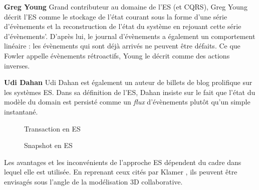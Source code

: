 \textbf{Greg Young} Grand contributeur au domaine de l'\gls{ES} (et \gls{CQRS}), Greg 
Young décrit l'\gls{ES} comme \og le stockage de l'état courant sous la forme 
d'une série d'évènements et la reconstruction de l'état du système en rejouant 
cette série d'évènements'\fg{}. D'après lui, le journal d'évènements a également 
un comportement linéaire : les évènements qui sont déjà arrivés ne peuvent 
être défaits. Ce que Fowler appelle évènements rétroactifs, Young le décrit 
comme des actions inverses.

\textbf{Udi Dahan} Udi Dahan est également un auteur de billets de blog 
prolifique sur les systèmes \gls{ES}. Dans sa définition de l'\gls{ES}, Dahan 
insiste sur le fait que \og l'état du modèle du domain est persisté comme un 
\textit{flux} d'évènements plutôt qu'un simple instantané\fg{}.


%
	\begin{figure}[!h]
		
		\centering
		\noindent
	
		\caption{Transaction en \gls{ES}}
		\label{fig:es-transaction}
	\end{figure}

	
	\begin{figure}[t]
		\centering
		
		\caption{Snapshot en \gls{ES}}
	\end{figure}

Les avantages et les inconvénients de l'approche \gls{ES} dépendent du
cadre dans lequel elle est utilisée. En reprenant ceux cités par Klamer 
\cite{Klamer2013a}, ils peuvent être envisagés sous l'angle de la modélisation 3D 
collaborative.

